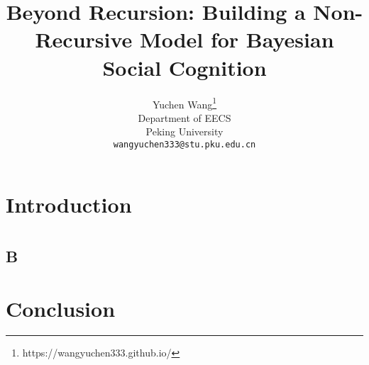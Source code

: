 \documentclass{article}
\title{Beyond Recursion: Building a Non-Recursive Model for Bayesian Social Cognition}
\author{%
  Yuchen Wang\thanks{https://wangyuchen333.github.io/} \\
  Department of EECS\\
  Peking University\\
  \texttt{wangyuchen333@stu.pku.edu.cn} \\
}
\begin{document}
\maketitle

\begin{abstract}

\end{abstract}


\section{Introduction}


\section{}


\section{}

\subsection{}


\subsection{B}



\section{Conclusion}


\cite{exampleReference}


\end{document}

